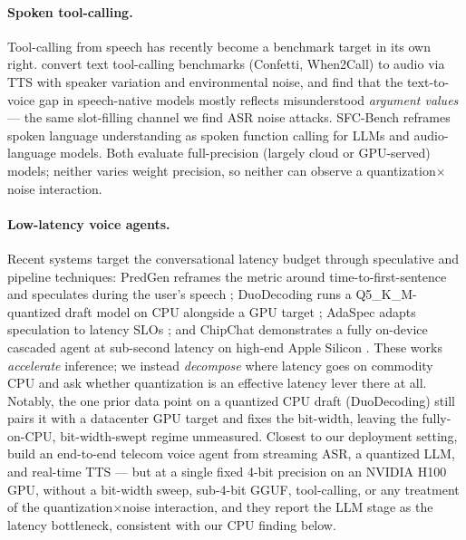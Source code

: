 \documentclass[11pt]{article}
\begin{document}
\paragraph{Spoken tool-calling.} Tool-calling from speech has recently become a
benchmark target in its own right. \citet{laskar2026} convert text tool-calling
benchmarks (Confetti, When2Call) to audio via TTS with speaker variation and
environmental noise, and find that the text-to-voice gap in speech-native models
mostly reflects misunderstood \emph{argument values} --- the same slot-filling channel
we find ASR noise attacks. SFC-Bench \citep{peng2026} reframes spoken language
understanding as spoken function calling for LLMs and audio-language models. Both
evaluate full-precision (largely cloud or GPU-served) models; neither varies weight
precision, so neither can observe a quantization$\times$noise interaction.

\paragraph{Low-latency voice agents.} Recent systems target the conversational latency
budget through speculative and pipeline techniques: PredGen reframes the metric around
time-to-first-sentence and speculates during the user's speech \citep{li2025predgen};
DuoDecoding runs a Q5\_K\_M-quantized draft model on CPU alongside a GPU target
\citep{lv2025}; AdaSpec adapts speculation to latency SLOs \citep{huang2025}; and
ChipChat demonstrates a fully on-device cascaded agent at sub-second latency on
high-end Apple Silicon \citep{likhomanenko2025}. These works \emph{accelerate}
inference; we instead \emph{decompose} where latency goes on commodity CPU and ask
whether quantization is an effective latency lever there at all. Notably, the one prior
data point on a quantized CPU draft (DuoDecoding) still pairs it with a datacenter GPU
target and fixes the bit-width, leaving the fully-on-CPU, bit-width-swept regime
unmeasured. Closest to our deployment setting, \citet{ethiraj2025} build an end-to-end
telecom voice agent from streaming ASR, a quantized LLM, and real-time TTS --- but at a
single fixed 4-bit precision on an NVIDIA H100 GPU, without a bit-width sweep, sub-4-bit
GGUF, tool-calling, or any treatment of the quantization$\times$noise interaction, and
they report the LLM stage as the latency bottleneck, consistent with our CPU finding
below.
\end{document}
